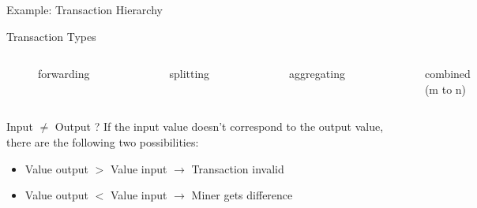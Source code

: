 \documentclass[]{beamer}
\begin{document}
\begin{frame}{Example: Transaction Hierarchy}
\resizebox{\textwidth}{!}{

}
\end{frame}


\begin{frame}{Transaction Types}
\begin{columns}

	\vspace{1cm}
	\begin{figure}
		
		\vspace{2.5em}
		\caption*{forwarding}
	\end{figure} 
	\vspace{0.4cm}
	\begin{figure}
		
		\caption*{splitting}
	\end{figure}
	\begin{figure}
		
		\caption*{aggregating}
	\end{figure}
	\vspace{0.5cm}
	\begin{figure}
		
		\caption*{combined (m to n)}
	\end{figure}
	
\end{columns}
\end{frame}


\begin{frame}{Input $\neq$ Output ?}
If the input value doesn't correspond to the output value, there are the following two possibilities:
\vspace{1em}
\begin{itemize}
    \item<1->{Value output $>$ Value input $\rightarrow$ Transaction invalid}
    \item<2->{Value output $<$ Value input $\rightarrow$ Miner gets difference}
    \end{itemize} 
    \vspace{1.5em}
\begin{center}
\end{center}  
\end{frame}
\end{document}
